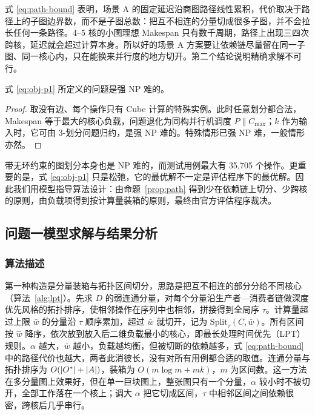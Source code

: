 式 \eqref{eq:path-bound} 表明，场景 A 的固定延迟沿商图路径线性累积，代价取决于路径上的子图边界数，而不是子图总数：把互不相连的分量切成很多子图，并不会拉长任何一条路径。4--5 核的小图理想 Makespan 只有数千周期，路径上出现三四次跨核，延迟就会超过计算本身。所以好的场景 A 方案要让依赖链尽量留在同一子图、同一核心内，只在能换来并行度的地方切开。第二个结论说明精确求解不可行。

\begin{proposition}\label{prop:np}
式 \eqref{eq:obj-p1} 所定义的问题是强 NP 难的。
\end{proposition}
\begin{proof}
取没有边、每个操作只有 Cube 计算的特殊实例。此时任意划分都合法，Makespan 等于最大的核心负载，问题退化为同构并行机调度 $P\|C_{\max}$；$k$ 作为输入时，它可由 3-划分问题归约，是强 NP 难的\cite{garey1978strong}。特殊情形已强 NP 难，一般情形亦然。
\end{proof}

带无环约束的图划分本身也是 NP 难的\cite{herrmann2019acyclic}，而测试用例最大有 35{,}705 个操作。更重要的是，式 \eqref{eq:obj-p1} 只是松弛，它的最优解不一定是评估程序下的最优解。因此我们用模型指导算法设计：由命题~\ref{prop:path} 得到少在依赖链上切分、少跨核的原则，由负载项得到按计算量装箱的原则，最终由官方评估程序裁决。

\subsection{问题一模型求解与结果分析}

\subsubsection{算法描述}

\label{sec:lpt}第一种构造是分量装箱与拓扑区间切分，思路是把互不相连的部分分给不同核心（算法~\ref{alg:lpt}）。先求 $D$ 的弱连通分量，对每个分量沿生产者—消费者链做深度优先风格的拓扑排序，使相邻操作在序列中也相邻，拼接得到全局序 $\tau$。计算量超过上限 $\bar w$ 的分量沿 $\tau$ 顺序累加，超过 $\bar w$ 就切开，记为 $\mathrm{Split}_\tau(C,\bar w)$。所有区间按 $\widehat w$ 降序，依次放到放入后二维负载最小的核心，即最长处理时间优先（LPT）规则。$\alpha$ 越大，$\bar w$ 越小，负载越均衡，但被切断的依赖越多，式 \eqref{eq:path-bound} 中的路径代价也越大，两者此消彼长，没有对所有用例都合适的取值。连通分量与拓扑排序为 $O(|O^{\ast}|+|A|)$，装箱为 $O(m\log m+mk)$，$m$ 为区间数。这一方法在多分量图上效果好，但在单一巨块图上，整张图只有一个分量，$\alpha$ 较小时不被切开，全部工作落在一个核上；调大 $\alpha$ 把它切成区间，$\tau$ 中相邻区间之间依赖很密，跨核后几乎串行。

